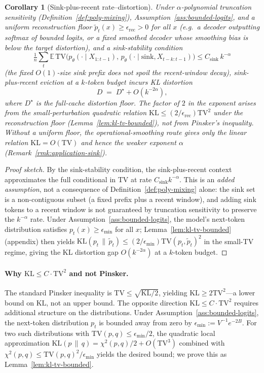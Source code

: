 \documentclass[11pt]{article}
\newcommand{\E}{\mathbb{E}}
\newcommand{\KLs}{\mathrm{KL}}
\newcommand{\TV}{\mathrm{TV}}
\theoremstyle{plain}
\newtheorem{corollary}[theorem]{Corollary}
\theoremstyle{definition}
\theoremstyle{remark}
\begin{document}
\begin{corollary}[Sink-plus-recent rate--distortion]\label{cor:topk}
Under $\alpha$-polynomial truncation sensitivity
(Definition~\ref{def:poly-mixing}), Assumption~\ref{ass:bounded-logits},
and a \emph{uniform reconstruction floor}
$\tilde p_t(x) \geq \epsilon_{\mathrm{rec}} > 0$ for all $x$ (e.g.\
a decoder outputting softmax of bounded logits, or a fixed smoothed
decoder whose smoothing bias is below the target distortion), and a
\emph{sink-stability} condition
\[
\tfrac1n\textstyle\sum_t\E\,\TV\bigl(p_\theta(\cdot\mid X_{1:t-1}),\,
p_\theta(\cdot\mid \mathrm{sink},X_{t-k:t-1})\bigr)\le
C_{\mathrm{sink}}\,k^{-\alpha}
\]
(the fixed $O(1)$-size sink prefix does not spoil the recent-window
decay), sink-plus-recent eviction at a $k$-token budget incurs KL
distortion
\[
D \;=\; D^\star + O(k^{-2\alpha}),
\]
where $D^\star$ is the full-cache distortion floor. The factor of
$2$ in the exponent arises from the small-perturbation quadratic
relation $\KLs \leq (2/\epsilon_{\mathrm{rec}})\TV^2$ under the
reconstruction floor (Lemma~\ref{lem:kl-tv-bounded}), not from
Pinsker's inequality. Without a uniform floor, the
operational-smoothing route gives only the linear relation
$\KLs = O(\TV)$ and hence the weaker exponent $\alpha$
(Remark~\ref{rmk:application-sink}).
\end{corollary}

\begin{proof}[Proof sketch]
By the sink-stability condition, the sink-plus-recent context
approximates the full conditional in TV at rate $C_{\mathrm{sink}}
k^{-\alpha}$. This is an \emph{added assumption}, not a consequence
of Definition~\ref{def:poly-mixing} alone: the sink set is a
non-contiguous subset (a fixed prefix plus a recent window), and
adding sink tokens to a recent window is not guaranteed by
truncation sensitivity to preserve the $k^{-\alpha}$ rate. Under
Assumption~\ref{ass:bounded-logits}, the model's next-token
distribution satisfies $p_t(x) \geq \epsilon_{\min}$ for all $x$;
Lemma~\ref{lem:kl-tv-bounded} (appendix) then yields
$\KLs(p_t \,\|\, \tilde p_t) \leq (2/\epsilon_{\min}) \TV(p_t,
\tilde p_t)^2$ in the small-TV regime, giving the KL distortion gap
$O(k^{-2\alpha})$ at a $k$-token budget.
\end{proof}

\paragraph{Why $\KLs \leq C \cdot \TV^2$ and not Pinsker.}
The standard Pinsker inequality is $\TV \leq \sqrt{\KLs/2}$,
yielding $\KLs \geq 2\TV^2$---a lower bound on $\KLs$, not an upper
bound. The opposite direction $\KLs \leq C \cdot \TV^2$ requires
additional structure on the distributions. Under
Assumption~\ref{ass:bounded-logits}, the next-token distribution
$p_t$ is bounded away from zero by
$\epsilon_{\min} := V^{-1} e^{-2B}$. For two such distributions
with $\TV(p, q) \leq \epsilon_{\min}/2$, the quadratic local
approximation $\KLs(p \,\|\, q) = \chi^2(p, q)/2 + O(\TV^3)$
combined with $\chi^2(p, q) \leq \TV(p, q)^2/\epsilon_{\min}$ yields
the desired bound; we prove this as Lemma~\ref{lem:kl-tv-bounded}.
\end{document}

